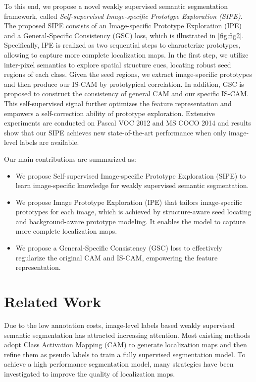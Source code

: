 \documentclass[10pt,twocolumn,letterpaper]{article}
\begin{document}
To this end, we propose a novel weakly supervised semantic segmentation framework, called \textit{Self-supervised Image-specific Prototype Exploration (SIPE)}.
The proposed SIPE consists of an Image-specific Prototype Exploration (IPE) and a General-Specific Consistency (GSC) loss, which is illustrated in \cref{fig:fig2}.
Specifically, IPE is realized as two sequential steps to characterize prototypes, allowing to capture more complete localization maps.
In the first step, we utilize inter-pixel semantics to explore spatial structure cues, locating robust seed regions of each class.
Given the seed regions, we extract image-specific prototypes and then produce our IS-CAM by prototypical correlation.
In addition, GSC is proposed to construct the consistency of general CAM and our specific IS-CAM.
This self-supervised signal further optimizes the feature representation and empowers a self-correction ability of prototype exploration.
Extensive experiments are conducted on Pascal VOC 2012 \cite{everingham2015pascal} and MS COCO 2014 \cite{lin2014coco} and results show that our SIPE achieves new state-of-the-art performance when only image-level labels are available.

Our main contributions are summarized as:
\begin{itemize}
\vspace{-5pt}
\item
We propose Self-supervised Image-specific Prototype Exploration (SIPE) to learn image-specific knowledge for weakly supervised semantic segmentation.
\vspace{-5pt}
\item
We propose Image Prototype Exploration (IPE) that tailors image-specific prototypes for each image, which is achieved by structure-aware seed locating and background-aware prototype modeling.
It enables the model to capture more complete localization maps.
\vspace{-5pt}
\item
We propose a General-Specific Consistency (GSC) loss to effectively regularize the original CAM and IS-CAM, empowering the feature representation.

\end{itemize}


\section{Related Work}
Due to the low annotation costs, image-level labels based weakly supervised semantic segmentation has attracted increasing attention.
Most existing methods adopt Class Activation Mapping (CAM) to generate localization maps and then refine them as pseudo labels to train a fully supervised segmentation model.
To achieve a high performance segmentation model, many strategies have been investigated to improve the quality of localization maps.
\end{document}
